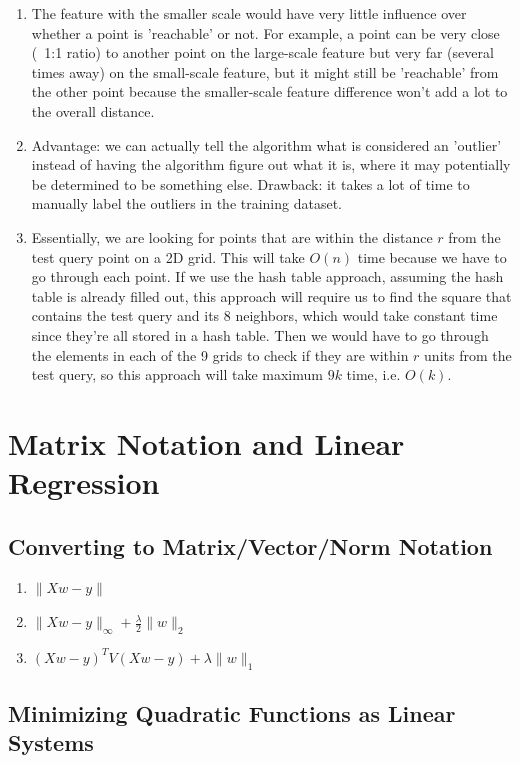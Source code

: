 \documentclass{article}
\def\norm#1{\|#1\|}
\def\enum#1{\begin{enumerate}#1\end{enumerate}}
\begin{document}
\enum{
\item The feature with the smaller scale would have very little influence over whether a point is 'reachable' or not. For example, a point can be very close (~1:1 ratio) to another point on the large-scale feature but very far (several times away) on the small-scale feature, but it might still be 'reachable' from the other point because the smaller-scale feature difference won't add a lot to the overall distance.
\item Advantage: we can actually tell the algorithm what is considered an 'outlier' instead of having the algorithm figure out what it is, where it may potentially be determined to be something else. Drawback: it takes a lot of time to manually label the outliers in the training dataset.
\item Essentially, we are looking for points that are within the distance $r$ from the test query point on a 2D grid. This will take $O(n)$ time because we have to go through each point. If we use the hash table approach, assuming the hash table is already filled out, this approach will require us to find the square that contains the test query and its 8 neighbors, which would take constant time since they're all stored in a hash table. Then we would have to go through the elements in each of the 9 grids to check if they are within $r$ units from the test query, so this approach will take maximum $9k$ time, i.e. $O(k)$.
}

\section{Matrix Notation and Linear Regression}

\subsection{Converting to Matrix/Vector/Norm Notation}

\begin{enumerate}
     \item  $ \norm{Xw-y}$
    \item  $ \norm{Xw-y}_\infty +   \frac{\lambda}{2}\norm{w}_2$
    \item  $ (Xw-y)^T V(Xw-y) +   \lambda\norm{w}_1$
\end{enumerate}


\subsection{Minimizing Quadratic Functions as Linear Systems}
\end{document}
